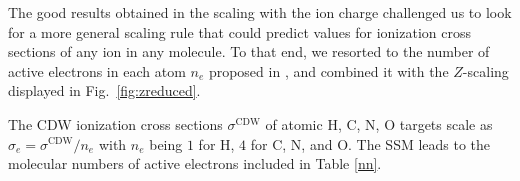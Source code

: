 \documentclass[10pt,showpacs,showkeys,twocolumn]{revtex4}
\begin{document}
The good results obtained in the scaling with the ion charge challenged us to look for a more general scaling rule that could predict values for ionization cross sections of any ion in any molecule.  %
To that end, we resorted to the %
number of active electrons in each atom $n_e$ proposed in \cite{MendezJPB20}, and combined it with the $Z$-scaling displayed in Fig.~\ref{fig:zreduced}. %

The CDW ionization cross sections $\sigma^{\mathrm{CDW}}$ of atomic H, C, N, O targets scale as $\sigma_e=\sigma^{\mathrm{CDW}}/n_e$ with $n_e$ being $1$ for H, $4$ for C, N, and O. %
The SSM leads to the molecular numbers of active electrons included in Table \ref{nn}.
\end{document}
